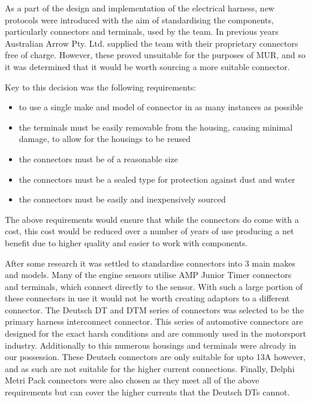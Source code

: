 As a part of the design and implementation of the electrical harness, new protocols were introduced with the aim of standardising the components, particularly connectors and terminals, used by the team.  In previous years    Australian Arrow Pty. Ltd. supplied the team with their proprietary connectors free of charge.  However, these proved unsuitable for the purposes of MUR, and so it was determined that it would be worth sourcing a more suitable connector.

Key to this decision was the following requirements:
\begin{itemize}
	\item to use a single make and model of connector in as many instances as possible
	\item the terminals must be easily removable from the housing, causing minimal damage, to allow for the housings to be reused
	\item the connectors must be of a reasonable size
	\item the connectors must be a sealed type for protection against dust and water
	\item the connectors must be easily and inexpensively sourced
\end{itemize}

The above requirements would ensure that while the connectors do come with a cost, this cost would be reduced over a number of years of use producing a net benefit due to higher quality and easier to work with components.

After some research it was settled to standardise connectors into 3 main makes and models.  Many of the engine sensors utilise AMP Junior Timer connectors and terminals, which connect directly to the sensor.  With such a large portion of these connectors in use it would not be worth creating adaptors to a different connector.  The Deutsch DT and DTM series of connectors was selected to be the primary harness interconnect connector.  This series of automotive connectors are designed for the exact harsh conditions and are commonly used in the motorsport industry.  Additionally to this numerous housings and terminals were already in our possession.  These Deutsch connectors are only suitable for upto 13A however, and as such are not suitable for the higher current connections.  Finally, Delphi Metri Pack connectors were also chosen as they meet all of the above requirements but can cover the higher currents that the Deutsch DTs cannot.

